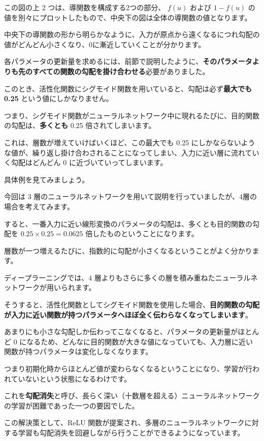 この図の上 2 つは、導関数を構成する2つの部分、 $f(u)$ および $1 - f(u)$ の値を別々にプロットしたもので、中央下の図は全体の導関数の値となります。

中央下の導関数の形から明らかなように、入力が原点から遠くなるにつれ勾配の値がどんどん小さくなり、0に漸近していくことが分かります。


各パラメータの更新量を求めるには、前節で説明したように、\textbf{そのパラメータよりも先のすべての関数の勾配を掛け合わせる}必要がありました。

このとき、活性化関数にシグモイド関数を用いていると、勾配は必ず\textbf{最大でも 0.25} という値にしかなりません。

つまり、シグモイド関数がニューラルネットワーク中に現れるたびに、目的関数の勾配は、\textbf{多くとも} 0.25 倍されてしまいます。

これは、層数が増えていけばいくほど、この最大でも 0.25 にしかならないような値が、繰り返し掛け合わされることになってしまい、入力に近い層に流れていく勾配はどんどん 0 に近づいていってしまいます。


具体例を見てみましょう。

今回は 3 層のニューラルネットワークを用いて説明を行っていましたが、4層の場合を考えてみます。

すると、一番入力に近い線形変換のパラメータの勾配は、多くとも目的関数の勾配を $0.25 \times 0.25 = 0.0625$ 倍したものということになります。

層数が一つ増えるたびに、指数的に勾配が小さくなるということがよく分かります。


ディープラーニングでは、4 層よりもさらに多くの層を積み重ねたニューラルネットワークが用いられます。

そうすると、活性化関数としてシグモイド関数を使用した場合、\textbf{目的関数の勾配が入力に近い関数が持つパラメータへほぼ全く伝わらなくなってしまいます}。

あまりにも小さな勾配しか伝わってこなくなると、パラメータの更新量がほとんど 0 になるため、どんなに目的関数が大きな値になっていても、入力層に近い関数が持つパラメータは変化しなくなります。

つまり初期化時からほとんど値が変わらなくなるということになり、学習が行われていないという状態になるわけです。

これを\textbf{勾配消失}と呼び、長らく深い（十数層を超える）ニューラルネットワークの学習が困難であった一つの要因でした。


この解決策として、ReLU 関数が提案され、多層のニューラルネットワークに対する学習も勾配消失を回避しながら行うことができるようになっています。


